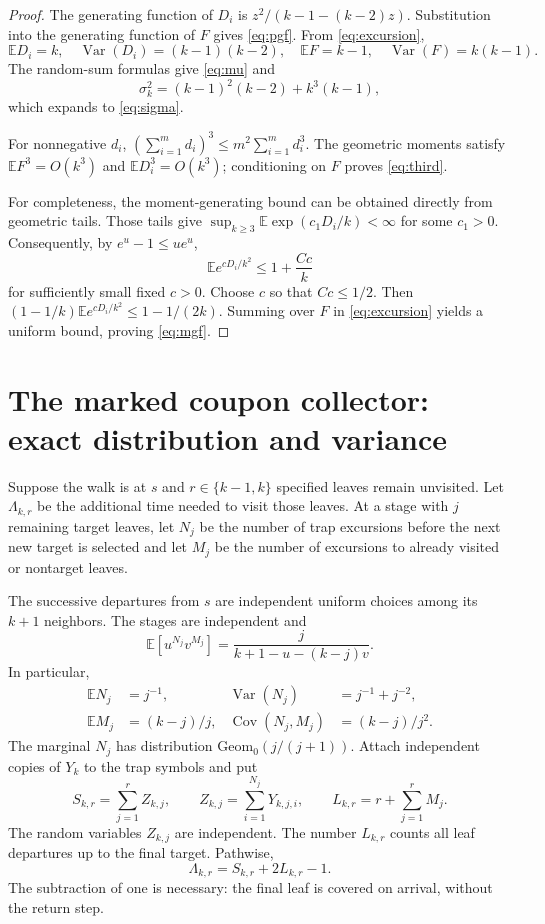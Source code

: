 \documentclass[11pt]{amsart}
\theoremstyle{remark}
\numberwithin{equation}{section}
\DeclareMathOperator{\Var}{Var}
\DeclareMathOperator{\Cov}{Cov}
\newcommand{\E}{\mathbb{E}}
\newcommand{\Geom}{\mathrm{Geom}}
\begin{document}
\begin{proof}
The generating function of $D_i$ is $z^2/(k-1-(k-2)z)$. Substitution into the generating function of $F$ gives \eqref{eq:pgf}. From \eqref{eq:excursion},
\[
\E D_i=k,\quad \Var(D_i)=(k-1)(k-2),\quad \E F=k-1,\quad \Var(F)=k(k-1).
\]
The random-sum formulas give \eqref{eq:mu} and
\[
\sigma_k^2=(k-1)^2(k-2)+k^3(k-1),
\]
which expands to \eqref{eq:sigma}.

For nonnegative $d_i$, $(\sum_{i=1}^m d_i)^3\le m^2\sum_{i=1}^m d_i^3$. The geometric moments satisfy $\E F^3=O(k^3)$ and $\E D_i^3=O(k^3)$; conditioning on $F$ proves \eqref{eq:third}.

For completeness, the moment-generating bound can be obtained directly from geometric tails. Those tails give $\sup_{k\ge 3}\E\exp(c_1D_i/k)<\infty$ for some $c_1>0$. Consequently, by $e^u-1\le ue^u$,
\[
\E e^{cD_i/k^2}\le 1+\frac{Cc}{k}
\]
for sufficiently small fixed $c>0$. Choose $c$ so that $Cc\le 1/2$. Then $(1-1/k)\E e^{cD_i/k^2}\le 1-1/(2k)$. Summing over $F$ in \eqref{eq:excursion} yields a uniform bound, proving \eqref{eq:mgf}.
\end{proof}

\section{The marked coupon collector: exact distribution and variance}\label{sec:coupon}

Suppose the walk is at $s$ and $r\in\{k-1,k\}$ specified leaves remain unvisited. Let $\Lambda_{k,r}$ be the additional time needed to visit those leaves. At a stage with $j$ remaining target leaves, let $N_j$ be the number of trap excursions before the next new target is selected and let $M_j$ be the number of excursions to already visited or nontarget leaves.

The successive departures from $s$ are independent uniform choices among its $k+1$ neighbors. The stages are independent and
\begin{equation}\label{eq:stage}
\E[u^{N_j}v^{M_j}]=\frac{j}{k+1-u-(k-j)v}.
\end{equation}
In particular,
\begin{align}
\E N_j&=j^{-1},& \Var(N_j)&=j^{-1}+j^{-2},\label{eq:Nj}\\
\E M_j&=(k-j)/j,& \Cov(N_j,M_j)&=(k-j)/j^2.\label{eq:Mj}
\end{align}
The marginal $N_j$ has distribution $\Geom_0(j/(j+1))$. Attach independent copies of $Y_k$ to the trap symbols and put
\[
S_{k,r}=\sum_{j=1}^rZ_{k,j},\qquad Z_{k,j}=\sum_{i=1}^{N_j}Y_{k,j,i},\qquad L_{k,r}=r+\sum_{j=1}^rM_j.
\]
The random variables $Z_{k,j}$ are independent. The number $L_{k,r}$ counts all leaf departures up to the final target. Pathwise,
\begin{equation}\label{eq:Lambda}
\Lambda_{k,r}=S_{k,r}+2L_{k,r}-1.
\end{equation}
The subtraction of one is necessary: the final leaf is covered on arrival, without the return step.
\end{document}
